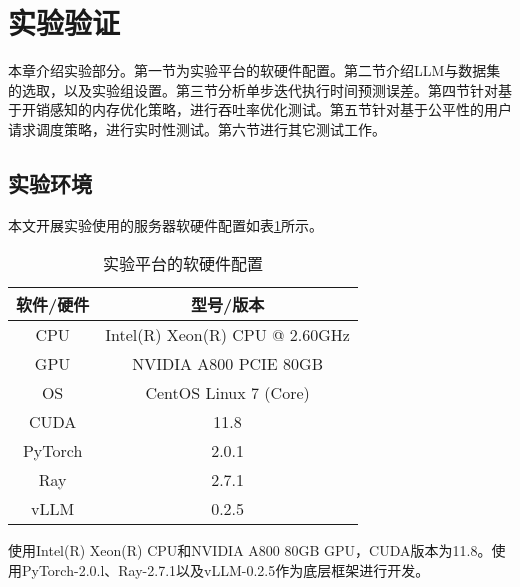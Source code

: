 \section{实验验证}

本章介绍实验部分。第一节为实验平台的软硬件配置。第二节介绍LLM与数据集的选取，以及实验组设置。第三节分析单步迭代执行时间预测误差。第四节针对基于开销感知的内存优化策略，进行吞吐率优化测试。第五节针对基于公平性的用户请求调度策略，进行实时性测试。第六节进行其它测试工作。

\subsection{实验环境}

本文开展实验使用的服务器软硬件配置如表\ref{Table:实验平台的软硬件配置}所示。

\begin{table}[H]
  \centering
  \caption{实验平台的软硬件配置}
  \label{Table:实验平台的软硬件配置}
  \renewcommand{\arraystretch}{1.2}
  \small
  \begin{tabular}{c c}
    \toprule
    \textbf{软件/硬件} & \textbf{型号/版本} \\ 
    \midrule
    CPU & Intel(R) Xeon(R) CPU @ 2.60GHz  \\ 
    GPU & NVIDIA A800 PCIE 80GB \\ 
    OS & CentOS Linux 7 (Core) \\ 
    CUDA & 11.8 \\ 
    PyTorch & 2.0.1 \\ 
    Ray & 2.7.1 \\
    vLLM & 0.2.5 \\ 
    \bottomrule
  \end{tabular}
\end{table}

使用Intel(R) Xeon(R) CPU和NVIDIA A800 80GB GPU，CUDA版本为11.8。使用PyTorch-2.0.l、Ray-2.7.1以及vLLM-0.2.5作为底层框架进行开发。 \par


